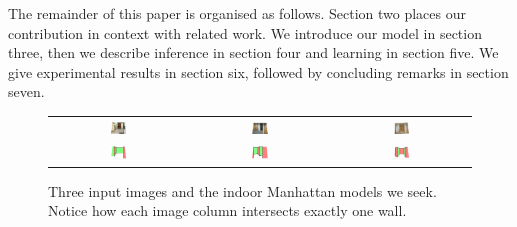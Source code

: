 
The remainder of this paper is organised as follows. Section two
places our contribution in context with related work. We introduce our
model in section three, then we describe inference in section four and
learning in section five. We give experimental results in section six,
followed by concluding remarks in section seven.

\begin{figure}[tb]%
  \centering
  \label{fig:ideal-models}
  \begin{tabular}{ccc}
    \includegraphics[width=0.12\textwidth]{figures/true_models/lab_foyer1_010_rect.png} &
    \includegraphics[width=0.12\textwidth]{figures/true_models/lab_kitchen_030_rect.png} &
    \includegraphics[width=0.12\textwidth]{figures/true_models/lab_ground1_030_rect.png} \\
    \includegraphics[width=0.12\textwidth]{figures/true_models/lab_foyer1_010} &
    \includegraphics[width=0.12\textwidth]{figures/true_models/lab_kitchen_030} &
    \includegraphics[width=0.12\textwidth]{figures/true_models/lab_ground1_030}
  \end{tabular}
  \hspace{0.2cm}
  \caption{Three input images and the indoor Manhattan models we
    seek. Notice how each image column intersects exactly one wall.}
\end{figure}

